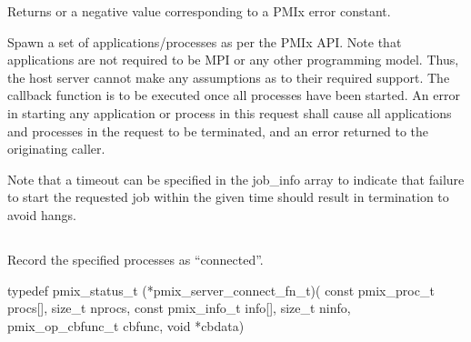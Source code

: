 \begin{arglist}
\end{arglist}

Returns  or a negative value corresponding to a PMIx error constant.

\descr

Spawn a set of applications/processes as per the PMIx API.
Note that applications are not required to be MPI or any other programming model.
Thus, the host server cannot make any assumptions as to their required support.
The callback function is to be executed once all processes have been started.
An error in starting any application or process in this request shall cause all applications and processes in the request to be terminated, and an error returned to the originating caller.

Note that a timeout can be specified in the job_info array to indicate that failure to start the requested job within the given time should result in termination to avoid hangs.


\subsection{}

\summary

Record the specified processes as ``connected''.

\format

\cspecificstart
\begin{codepar}
typedef pmix_status_t (*pmix_server_connect_fn_t)(
                             const pmix_proc_t procs[], size_t nprocs,
                             const pmix_info_t info[], size_t ninfo,
                             pmix_op_cbfunc_t cbfunc, void *cbdata)
\end{codepar}
\cspecificend

\begin{arglist}
\end{arglist}

